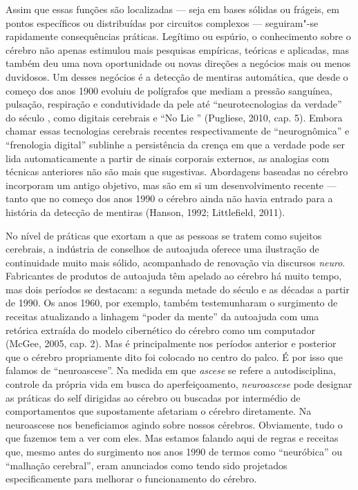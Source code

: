 Assim que essas funções são localizadas --- seja em bases sólidas ou
frágeis, em pontos específicos ou distribuídas por circuitos complexos
--- seguiram"-se rapidamente consequências práticas. Legítimo ou espúrio,
o conhecimento sobre o cérebro não apenas estimulou mais pesquisas
empíricas, teóricas e aplicadas, mas também deu uma nova oportunidade ou
novas direções a negócios mais ou menos duvidosos. Um desses negócios é
a detecção de mentiras automática, que desde o começo dos anos 1900
evoluiu de polígrafos que mediam a pressão sanguínea, pulsação,
respiração e condutividade da pele até ``neurotecnologias da verdade''
do século , como digitais cerebrais e ``No Lie '' (Pugliese, 2010,
cap. 5). Embora chamar essas tecnologias cerebrais recentes
respectivamente de ``neurognômica'' e ``frenologia digital'' sublinhe a
persistência da crença em que a verdade pode ser lida automaticamente a
partir de sinais corporais externos, as analogias com técnicas
anteriores não são mais que sugestivas. Abordagens baseadas no cérebro
incorporam um antigo objetivo, mas são em si um desenvolvimento recente
--- tanto que no começo dos anos 1990 o cérebro ainda não havia entrado
para a história da detecção de mentiras (Hanson, 1992; Littlefield,
2011).

No nível de práticas que exortam a que as pessoas se tratem como
sujeitos cerebrais, a indústria de conselhos de autoajuda oferece uma
ilustração de continuidade muito mais sólido, acompanhado de renovação
via discursos \emph{neuro}. Fabricantes de produtos de autoajuda têm
apelado ao cérebro há muito tempo, mas dois períodos se destacam: a
segunda metade do século  e as décadas a partir de 1990. Os anos
1960, por exemplo, também testemunharam o surgimento de receitas
atualizando a linhagem ``poder da mente'' da autoajuda com uma retórica
extraída do modelo cibernético do cérebro como um computador (McGee,
2005, cap. 2). Mas é principalmente nos períodos anterior e posterior
que o cérebro propriamente dito foi colocado no centro do palco. É por
isso que falamos de ``neuroascese''. Na medida em que \emph{ascese} se
refere a autodisciplina, controle da própria vida em busca do
aperfeiçoamento, \emph{neuroascese} pode designar as práticas do self
dirigidas ao cérebro ou buscadas por intermédio de comportamentos que
supostamente afetariam o cérebro diretamente. Na neuroascese nos
beneficiamos agindo sobre nossos cérebros. Obviamente, tudo o que
fazemos tem a ver com eles. Mas estamos falando aqui de regras e
receitas que, mesmo antes do surgimento nos anos 1990 de termos como
``neuróbica'' ou ``malhação cerebral'', eram anunciados como tendo sido
projetados especificamente para melhorar o funcionamento do cérebro.

